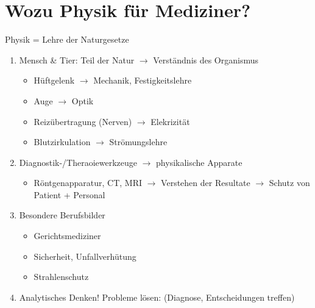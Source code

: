 \setcounter{chapter}{-1}
\chapter{Wozu Physik für Mediziner?}
Physik = Lehre der Naturgesetze
\begin{enumerate}
	\item Mensch \& Tier: Teil der Natur $\rightarrow$ Verständnis des Organismus
		\begin{bsp*}
			\begin{itemize}
				\item Hüftgelenk $\rightarrow$ Mechanik, Festigkeitslehre
				\item Auge $\rightarrow$ Optik
				\item Reizübertragung (Nerven) $\rightarrow$ Elekrizität
				\item Blutzirkulation $\rightarrow$ Strömungslehre
			\end{itemize}
		\end{bsp*}
	\item Diagnostik-/Theraoiewerkzeuge $\rightarrow$ physikalische Apparate
		\begin{bsp*}
			\begin{itemize}
				\item Röntgenapparatur, CT, MRI $\rightarrow$ Verstehen der Resultate $\rightarrow$ Schutz von Patient + Personal
			\end{itemize}
		\end{bsp*}
	\item Besondere Berufsbilder
		\begin{itemize}
			\item Gerichtsmediziner
			\item Sicherheit, Unfallverhütung
			\item Strahlenschutz
		\end{itemize}
	\item Analytisches Denken! Probleme lösen: (Diagnose, Entscheidungen treffen)
\end{enumerate}